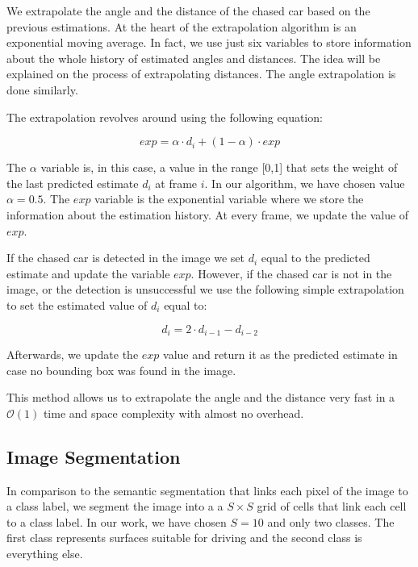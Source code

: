 We extrapolate the angle and the distance of the chased car based on the previous estimations. At the heart of the extrapolation algorithm is an exponential moving average. In fact, we use just six variables to store information about the whole history of estimated angles and distances. The idea will be explained on the process of extrapolating distances. The angle extrapolation is done similarly. \par


The extrapolation revolves around using the following equation:\par


\begin{equation}
exp = \alpha\cdot d_i + (1-\alpha)\cdot exp
\end{equation}

The $\alpha$ variable is, in this case, a value in the range [0,1] that sets the weight of the last predicted estimate $d_i$ at frame $i$. In our algorithm, we have chosen value $\alpha=0.5$. The $exp$ variable is the exponential variable where we store the information about the estimation history. At every frame, we update the value of $exp$. \par

If the chased car is detected in the image we set $d_i$ equal to the predicted estimate and update the variable $exp$.
However, if the chased car is not in the image, or the detection is unsuccessful we use the following simple extrapolation to set the estimated value of $d_i$ equal to: \par


\begin{equation}
d_i = 2\cdot d_{i-1} - d_{i-2}
\end{equation}

Afterwards, we update the $exp$ value and return it as the predicted estimate in case no bounding box was found in the image. \par 


This method allows us to extrapolate the angle and the distance very fast in a $\mathcal{O}(1)$ time and space complexity with almost no overhead.




\subsection{Image Segmentation}
In comparison to the semantic segmentation that links each pixel of the image to a class label, we segment the image into a a $S\times S$ grid of cells that link each cell to a class label. In our work, we have chosen $S=10$ and only two classes. The first class represents surfaces suitable for driving and the second class is everything else. \par


